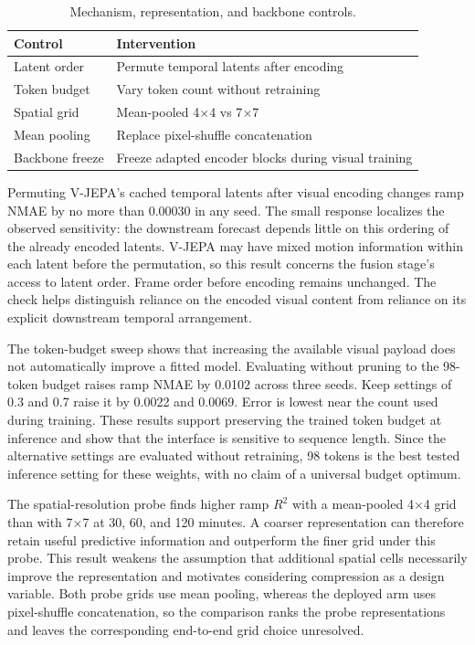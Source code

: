 \begin{table}[htbp]
\centering
\begin{tabularx}{\textwidth}{@{}lY@{}}
\hline
Control & Intervention \\
\hline
Latent order & Permute temporal latents after encoding \\
Token budget & Vary token count without retraining \\
Spatial grid & Mean-pooled 4$\times$4 vs 7$\times$7 \\
Mean pooling & Replace pixel-shuffle concatenation \\
Backbone freeze & Freeze adapted encoder blocks during visual training \\
\hline
\end{tabularx}
\caption{Mechanism, representation, and backbone controls.}
\label{tab:ablation-registry-continued}
\end{table}

Permuting V-JEPA's cached temporal latents after visual encoding changes ramp NMAE by no more than 0.00030 in any seed. The small response localizes the observed sensitivity: the downstream forecast depends little on this ordering of the already encoded latents. V-JEPA may have mixed motion information within each latent before the permutation, so this result concerns the fusion stage's access to latent order. Frame order before encoding remains unchanged. The check helps distinguish reliance on the encoded visual content from reliance on its explicit downstream temporal arrangement.

The token-budget sweep shows that increasing the available visual payload does not automatically improve a fitted model. Evaluating without pruning to the 98-token budget raises ramp NMAE by 0.0102 across three seeds. Keep settings of 0.3 and 0.7 raise it by 0.0022 and 0.0069. Error is lowest near the count used during training. These results support preserving the trained token budget at inference and show that the interface is sensitive to sequence length. Since the alternative settings are evaluated without retraining, 98 tokens is the best tested inference setting for these weights, with no claim of a universal budget optimum.

The spatial-resolution probe finds higher ramp $R^2$ with a mean-pooled 4$\times$4 grid than with 7$\times$7 at 30, 60, and 120 minutes. A coarser representation can therefore retain useful predictive information and outperform the finer grid under this probe. This result weakens the assumption that additional spatial cells necessarily improve the representation and motivates considering compression as a design variable. Both probe grids use mean pooling, whereas the deployed arm uses pixel-shuffle concatenation, so the comparison ranks the probe representations and leaves the corresponding end-to-end grid choice unresolved.

